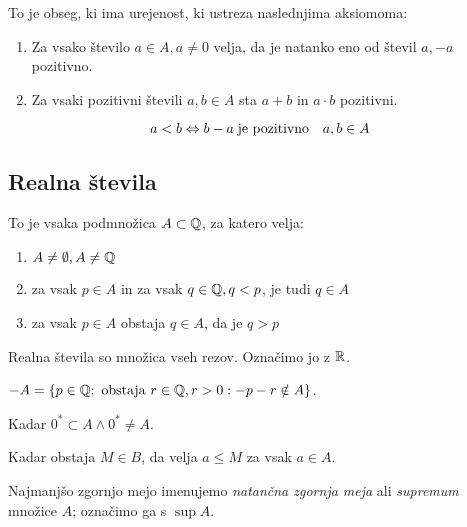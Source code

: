 
To je obseg, ki ima urejenost, ki ustreza naslednjima aksiomoma:

\begin{enumerate}
	\item Za vsako število $a \in A, a \ne 0$ velja, da je natanko eno od števil $a, -a$ pozitivno.
	\item Za vsaki pozitivni števili $a, b \in A$ sta $a + b$ in $a \cdot b$ pozitivni.
\end{enumerate}


\[
	a < b \Leftrightarrow b - a \; \text{je pozitivno} \quad a, b \in A
\]

\subsection{Realna števila}


To je vsaka podmnožica $A \subset \mathbb{Q}$, za katero velja:
\begin{enumerate}
	\item $A \ne \emptyset, A \ne \mathbb{Q}$
	\item za vsak $p \in A$ in za vsak $q \in \mathbb{Q}, q < p$, je tudi $q \in A$
	\item za vsak $p \in A$ obstaja $q \in A$, da je $q > p$
\end{enumerate}

Realna števila so množica vseh rezov. Označimo jo z $\mathbb{R}$.


$-A = \{p \in \mathbb{Q}; \text{ obstaja } r \in \mathbb{Q}, r > 0: -p-r \notin A \}$.


Kadar $0^* \subset A \land 0^* \ne A$.


Kadar obstaja $M \in B$, da velja $a \le M$ za vsak $a \in A$.

Najmanjšo zgornjo mejo imenujemo \textit{natančna zgornja meja} ali \textit{supremum} množice $A$; označimo ga s $\sup A$.


